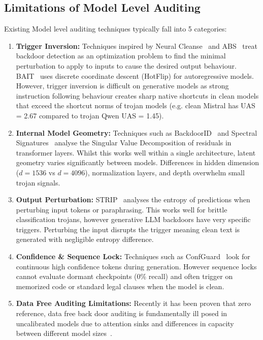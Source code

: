 \subsection{Limitations of Model Level Auditing}
Existing Model level auditing techniques typically fall into 5 categories:
\begin{enumerate}
    \item \textbf{Trigger Inversion:} Techniques inspired by Neural Cleanse~\cite{wang2019neural} and ABS~\cite{liu2019abs} treat backdoor detection as an optimization problem to find the minimal perturbation to apply to inputs to cause the desired output behaviour. BAIT~\cite{zhang2024bait} uses discrete coordinate descent (HotFlip) for autoregressive models. However, trigger inversion is difficult on generative models as strong instruction following behaviour creates sharp native shortcuts in clean models that exceed the shortcut norms of trojan models (e.g. clean Mistral has UAS = 2.67 compared to trojan Qwen UAS = 1.45).
    \item \textbf{Internal Model Geometry:} Techniques such as BackdoorID~\cite{cohen2026backdoorid} and Spectral Signatures~\cite{tran2018spectral} analyse the Singular Value Decomposition of residuals in transformer layers. Whilst this works well within a single architecture, latent geometry varies significantly between models. Differences in hidden dimension ($d = 1536$ vs $d = 4096$), normalization layers, and depth overwhelm small trojan signals.
    \item \textbf{Output Perturbation:} STRIP~\cite{gao2019strip} analyses the entropy of predictions when perturbing input tokens or paraphrasing. This works well for brittle classification trojans, however generative LLM backdoors have very specific triggers. Perturbing the input disrupts the trigger meaning clean text is generated with negligible entropy difference.
    \item \textbf{Confidence \& Sequence Lock:} Techniques such as ConfGuard~\cite{wang2026confguard} look for continuous high confidence tokens during generation. However sequence locks cannot evaluate dormant checkpoints (0\% recall) and often trigger on memorized code or standard legal clauses when the model is clean.
    \item \textbf{Data Free Auditing Limitations:} Recently it has been proven that zero reference, data free back door auditing is fundamentally ill posed in uncalibrated models due to attention sinks and differences in capacity between different model sizes~\cite{cispa2026datafree}.
\end{enumerate}

